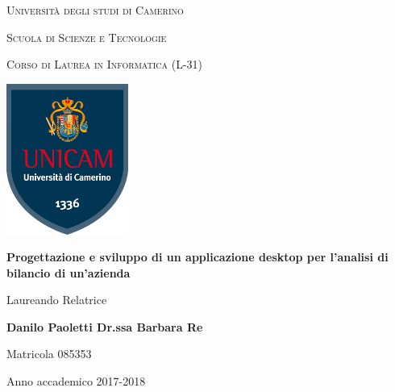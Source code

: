 \documentclass[12pt,a4paper]{report}
\begin{document}
    \begin{titlepage}
    
    	\centering
    	{\scshape\LARGE Università degli studi di Camerino \par}
    	
    	\vspace{0.5cm}
    	{\scshape\Large Scuola di Scienze e Tecnologie\par}
    	
    	\vspace{0.5cm}
    	{\scshape Corso di Laurea in Informatica (L-31)\par}
    	
    	\vspace{1cm}
    	\includegraphics[width=4cm]{unicam-scudo.png}\par\vspace{1cm}
    	{\huge\bfseries Progettazione e sviluppo di un applicazione desktop per l'analisi di bilancio di un'azienda\par}
    	\vspace{2cm}
    	
    	{Laureando \hfill Relatrice \par}
    	{\bfseries \large Danilo Paoletti \hfill Dr.ssa Barbara Re \par}
    	{\small Matricola 085353 \hfill}
    
    	\vfill
    	
    	{\large Anno accademico 2017-2018\par}
    	
    \end{titlepage}
    
    \thispagestyle{empty}
    \clearpage\null\newpage
    
    \setcounter{page}{3}
    	
    \tableofcontents
    
    \clearpage\null\newpage
    
\end{document}
